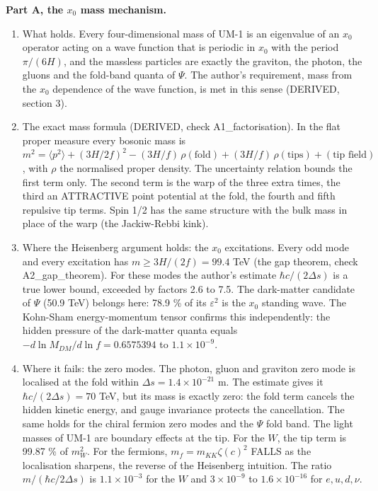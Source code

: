 \documentclass[11pt]{article}
\begin{document}
\textbf{Part A, the $x_0$ mass mechanism.}

\begin{enumerate}
\item What holds. Every four-dimensional mass of UM-1 is an eigenvalue of an $x_0$ operator acting on a wave function that is periodic in $x_0$ with the period $\pi/(6H)$, and the massless particles are exactly the graviton, the photon, the gluons and the fold-band quanta of $\Psi$. The author's requirement, mass from the $x_0$ dependence of the wave function, is met in this sense (DERIVED, section 3).
\item The exact mass formula (DERIVED, check A1\_factorisation). In the flat proper measure every bosonic mass is $m^2 = \langle p^2\rangle + (3H/2f)^2 - (3H/f)\,\rho(\text{fold}) + (3H/f)\,\rho(\text{tips}) + (\text{tip field})$, with $\rho$ the normalised proper density. The uncertainty relation bounds the first term only. The second term is the warp of the three extra times, the third an ATTRACTIVE point potential at the fold, the fourth and fifth repulsive tip terms. Spin 1/2 has the same structure with the bulk mass in place of the warp (the Jackiw-Rebbi kink).
\item Where the Heisenberg argument holds: the $x_0$ excitations. Every odd mode and every excitation has $m \geq 3H/(2f) = 99.4$ TeV (the gap theorem, check A2\_gap\_theorem). For these modes the author's estimate $\hbar c/(2\Delta s)$ is a true lower bound, exceeded by factors 2.6 to 7.5. The dark-matter candidate of $\Psi$ (50.9 TeV) belongs here: 78.9 \% of its $\varepsilon^2$ is the $x_0$ standing wave. The Kohn-Sham energy-momentum tensor confirms this independently: the hidden pressure of the dark-matter quanta equals $-d\ln M_{DM}/d\ln f = 0.6575394$ to $1.1\times10^{-9}$.
\item Where it fails: the zero modes. The photon, gluon and graviton zero mode is localised at the fold within $\Delta s = 1.4\times10^{-21}$ m. The estimate gives it $\hbar c/(2\Delta s) = 70$ TeV, but its mass is exactly zero: the fold term cancels the hidden kinetic energy, and gauge invariance protects the cancellation. The same holds for the chiral fermion zero modes and the $\Psi$ fold band. The light masses of UM-1 are boundary effects at the tip. For the $W$, the tip term is 99.87 \% of $m_W^2$. For the fermions, $m_f = m_{KK}\zeta(c)^2$ FALLS as the localisation sharpens, the reverse of the Heisenberg intuition. The ratio $m/(\hbar c/2\Delta s)$ is $1.1\times10^{-3}$ for the $W$ and $3\times10^{-9}$ to $1.6\times10^{-16}$ for $e, u, d, \nu$.

\end{enumerate}
\end{document}
